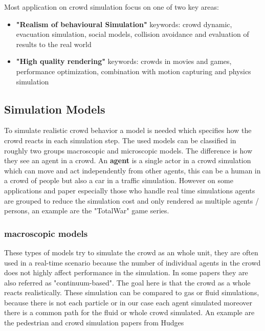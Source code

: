 \documentclass[sigconf]{acmart}
\begin{document}
Most application on crowd simulation focus on one of two key areas: 
\begin{itemize}
\item \textbf{"Realism of behavioural Simulation"}\cite{thalmann_crowd_2013} keywords: crowd dynamic, evacuation simulation, social models, collision avoidance and evaluation of results to the real world
\item \textbf{"High quality rendering"}\cite{thalmann_crowd_2013} keywords: crowds in movies and games, performance optimization, combination with motion capturing and physics simulation  
\end{itemize}


\cite{thalmann_crowd_2013}

\subsection{Simulation Models}

To simulate realistic crowd behavior a model is needed which specifies how the crowd reacts in each simulation step. The used models can be classified in roughly two groups macroscopic and microscopic models. The difference is how they see an agent in a crowd. An \textbf{agent} is a single actor in a crowd simulation which can move and act independently from other agents, this can be a human in a crowd of people but also a car in a traffic simulation. However on some applications and paper especially those who handle real time simulations agents are grouped to reduce the simulation cost and only rendered as multiple agents / persons, an example are the "TotalWar" \cite{total_war_website} \cite{thalmann_crowd_2013} game series.

\subsubsection{\textbf{macroscopic models}}
These types of models try to simulate the crowd as an whole unit, they are often used in a real-time scenario because the number of individual agents in the crowd does not highly affect performance in the simulation. In some papers they are also referred as "continuum-based"\cite{xu_crowd_2014}. The goal here is that the crowd as a whole reacts realistically. These simulation can be compared to gas or fluid simulations, because there is not each particle or in our case each agent simulated moreover there is a common path for the fluid or whole crowd simulated. An example are the pedestrian and crowd simulation papers from Hudges \cite{hughes_continuum_2002} \cite{hughes_flow_2003}
\end{document}
